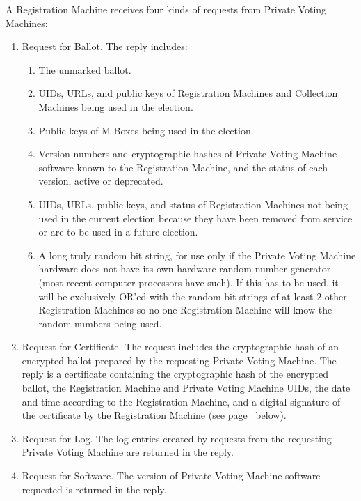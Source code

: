 \documentclass[12pt]{article}
\newcommand{\pagref}[1]{(see page~\pageref{#1} below)}
\begin{document}
A Registration Machine receives four kinds of requests from
Private Voting Machines:
\begin{enumerate}

\item
Request for Ballot.  The reply includes:
\begin{enumerate}
\item The unmarked ballot.
\item UIDs, URLs, and public keys
      of Registration Machines and Collection Machines being used
      in the election.
\item Public keys of M-Boxes being used in the election.
\item Version numbers and cryptographic hashes
      of Private Voting Machine software
      known to the Registration Machine, and
      the status of each version, active or deprecated.
\item UIDs, URLs, public keys, and status of Registration Machines not
      being used in the current election because they have been removed
      from service or are to be used in a future election.
\item A long truly random bit string, for use only if the
      Private Voting Machine hardware does not have its own hardware
      random number generator (most recent computer processors have
      such).  If this has to be used, it will be exclusively OR'ed with
      the random bit strings of at least 2 other Registration Machines
      so no one Registration Machine will know the random numbers being
      used.
\end{enumerate}

\item
Request for Certificate.  The request includes the cryptographic hash
of an encrypted ballot prepared by the requesting Private
Voting Machine.  The reply is a certificate containing
the cryptographic hash of the encrypted ballot,
the Registration Machine and Private Voting Machine UIDs,
the date and time according to the Registration Machine,
and a digital signature of the certificate by the Registration Machine
\pagref{CERTIFICATE-DETAILS}.

\item
Request for Log.  The log entries created by requests from the
requesting Private Voting Machine are returned in the reply.

\item
Request for Software.  The version of Private Voting Machine software
requested is returned in the reply.

\end{enumerate}
\end{document}
